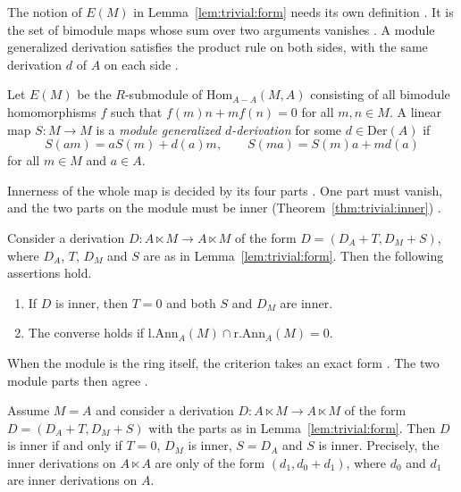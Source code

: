 The notion of $E(M)$ in Lemma~\ref{lem:trivial:form} needs its own definition
\cite[p.~7]{BennisFahid2017}. It is the set of bimodule maps whose sum over two
arguments vanishes \cite[p.~7]{BennisFahid2017}. A module generalized derivation
satisfies the product rule on both sides, with the same derivation $d$ of $A$ on each
side \cite[p.~7]{BennisFahid2017}.

\begin{definition}\label{def:trivial:egeneral}
Let $E(M)$ be the $R$-submodule of $\mathrm{Hom}_{A-A}(M,A)$ consisting of all
bimodule homomorphisms $f$ such that $f(m)n+mf(n)=0$ for all $m,n\in M$. A linear
map $S\colon M\to M$ is a \emph{module generalized $d$-derivation} for some
$d\in\mathrm{Der}(A)$ if
\begin{equation*}
S(am)=aS(m)+d(a)m,\qquad S(ma)=S(m)a+md(a)
\end{equation*}
for all $m\in M$ and $a\in A$.
\end{definition}

Innerness of the whole map is decided by its four parts
\cite[p.~14]{BennisFahid2017}. One part must vanish, and the two parts on the module
must be inner (Theorem~\ref{thm:trivial:inner}) \cite[p.~14]{BennisFahid2017}.

\begin{theorem}\label{thm:trivial:inner}
Consider a derivation $D\colon A\ltimes M\to A\ltimes M$ of the form
$D=(D_{A}+T,D_{M}+S)$, where $D_{A}$, $T$, $D_{M}$ and $S$ are as in
Lemma~\ref{lem:trivial:form}. Then the following assertions hold.
\begin{enumerate}[label=(\arabic*)]
\item If $D$ is inner, then $T=0$ and both $S$ and $D_{M}$ are inner.
\item The converse holds if $\mathrm{l.Ann}_{A}(M)\cap\mathrm{r.Ann}_{A}(M)=0$.
\end{enumerate}
\end{theorem}

When the module is the ring itself, the criterion takes an exact form
\cite[p.~14]{BennisFahid2017}. The two module parts then agree \cite[p.~14]{BennisFahid2017}.

\begin{corollary}\label{cor:trivial:self}
Assume $M=A$ and consider a derivation $D\colon A\ltimes M\to A\ltimes M$ of the
form $D=(D_{A}+T,D_{M}+S)$ with the parts as in Lemma~\ref{lem:trivial:form}. Then
$D$ is inner if and only if $T=0$, $D_{M}$ is inner, $S=D_{A}$ and $S$ is inner.
Precisely, the inner derivations on $A\ltimes A$ are only of the form
$(d_{1},d_{0}+d_{1})$, where $d_{0}$ and $d_{1}$ are inner derivations on $A$.
\end{corollary}


